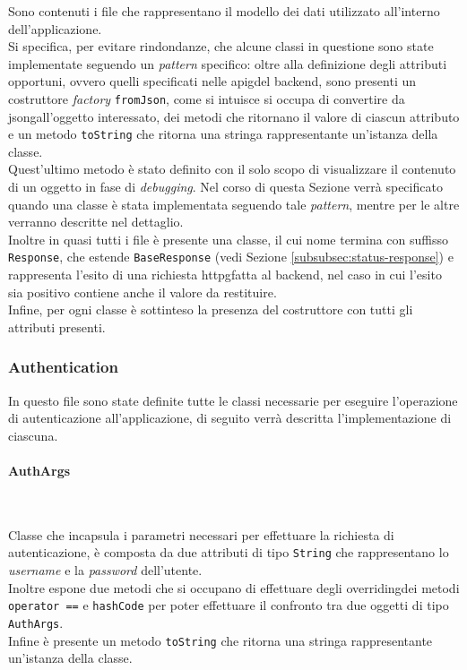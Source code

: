 Sono contenuti i file che rappresentano il modello dei dati utilizzato all'interno dell'applicazione.\\
Si specifica, per evitare rindondanze, che alcune classi in questione sono state implementate seguendo un \emph{pattern} specifico: oltre alla definizione degli attributi opportuni, ovvero quelli specificati nelle \gls{apig}\glsoccur del \gls{backend}\glsoccur, sono presenti un costruttore \emph{factory} \cite{site:factory} \lstinline{fromJson}, come si intuisce si occupa di convertire da \gls{jsong}\glsoccur all'oggetto interessato, dei metodi che ritornano il valore di ciascun attributo e un metodo \lstinline{toString} che ritorna una stringa rappresentante un'istanza della classe.\\
Quest'ultimo metodo è stato definito con il solo scopo di visualizzare il contenuto di un oggetto in fase di \emph{debugging}.
Nel corso di questa Sezione verrà specificato quando una classe è stata implementata seguendo tale \emph{pattern}, mentre per le altre verranno descritte nel dettaglio. \\
Inoltre in quasi tutti i file è presente una classe, il cui nome termina con suffisso \lstinline{Response}, che estende \lstinline{BaseResponse} (vedi Sezione \ref{subsubsec:status-response}) e rappresenta l'esito di una richiesta \gls{httpg}\glsoccur fatta al \gls{backend}\glsoccur, nel caso in cui l'esito sia positivo contiene anche il valore da restituire.\\
Infine, per ogni classe è sottinteso la presenza del costruttore con tutti gli attributi presenti. 

\subsubsection*{Authentication}
\label{subsubsec:authentication}

In questo file sono state definite tutte le classi necessarie per eseguire l'operazione di autenticazione all'applicazione, di seguito verrà descritta l'implementazione di ciascuna.

\paragraph*{AuthArgs} ~ \\
\label{par:auth-args}

\noindent Classe che incapsula i parametri necessari per effettuare la richiesta di autenticazione, è composta da due attributi di tipo \lstinline{String} che rappresentano lo \emph{username} e la \emph{password} dell'utente.\\
Inoltre espone due metodi che si occupano di effettuare degli \gls{overriding}\glsoccur dei metodi \lstinline{operator ==} \cite{site:operator-equals} e \lstinline{hashCode} \cite{site:hascode-property} per poter effettuare il confronto tra due oggetti di tipo \lstinline{AuthArgs}.\\
Infine è presente un metodo \lstinline{toString} che ritorna una stringa rappresentante un'istanza della classe.

